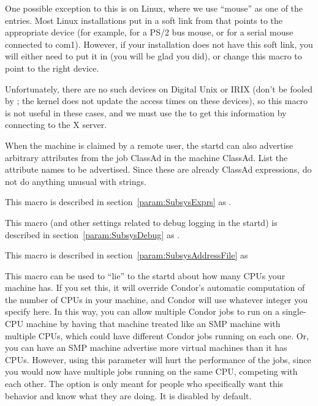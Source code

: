 \begin{description}
  One possible exception to this is on Linux, where
  we use ``mouse'' as
  one of the entries.  Most Linux installations put in a
  soft link from  that points to the appropriate
  device (for example,  for a PS/2 bus mouse, or
   for a serial mouse connected to com1).  However,
  if your installation does not have this soft link, you will either
  need to put it in (you will be glad you did), or change this
  macro to point to the right device. 
  
  Unfortunately, there are no such devices on Digital Unix or IRIX
  (don't be fooled by ; the kernel does not
  update the access times on these devices), so this macro is not
  useful in these cases, and we must use the  to get this
  information by connecting to the X server.
  
\item[\Macro{STARTD\_JOB\_EXPRS}] \label{param:StartdJobExprs} When
  the machine is claimed by a remote user, the startd can also advertise
  arbitrary attributes from the job ClassAd in the machine
  ClassAd.
  List the attribute names to be advertised.  \Note Since
  these are already ClassAd expressions, do not do anything
  unusual with strings.

\item[\Macro{STARTD\_EXPRS}] \label{param:StartdExprs} This macro is
  described in section~\ref{param:SubsysExprs} as
  .

\item[\Macro{STARTD\_DEBUG}] \label{param:StartdDebug} This macro
  (and other settings related to debug logging in the startd) is
  described in section~\ref{param:SubsysDebug} as
  .

\item[\Macro{STARTD\_ADDRESS\_FILE}] \label{param:StartdAddressFile}
  This macro is described in
  section~\ref{param:SubsysAddressFile} as

\item[\Macro{NUM\_CPUS}] \label{param:NumCpus}
  This macro can be used to ``lie'' to the startd about how many CPUs
  your machine has.
  If you set this, it will override Condor's automatic computation of
  the number of CPUs in your machine, and Condor will use whatever
  integer you specify here. 
  In this way, you can allow multiple Condor jobs to run on a
  single-CPU machine by having that machine treated like an SMP
  machine with multiple CPUs, which could have different Condor jobs
  running on each one.
  Or, you can have an SMP machine advertise more virtual machines than
  it has CPUs.
  However, using this parameter will hurt the performance of the jobs,
  since you would now have multiple jobs running on the same CPU,
  competing with each other.
  The option is only meant for people who specifically want this
  behavior and know what they are doing.  
  It is disabled by default.


\end{description}
